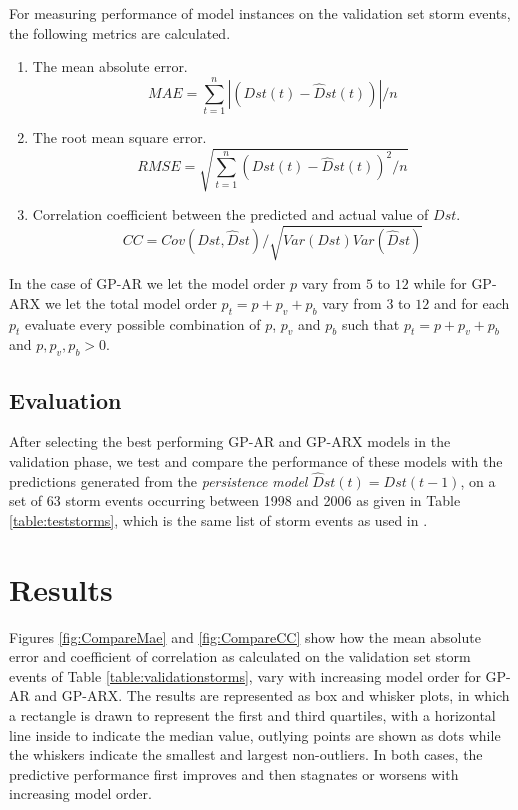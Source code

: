 For measuring performance of model instances on the validation set storm events, the following metrics are calculated.

\begin{enumerate}
    \item The mean absolute error.
    \begin{equation}
        MAE = \sum_{t=1}^{n} \left |(Dst(t) - \hat{D}st(t)) \right | / n
    \end{equation}
    \item The root mean square error.
    \begin{equation}
        RMSE = \sqrt{\sum_{t=1}^{n} (Dst(t) - \hat{D}st(t))^2 / n}
    \end{equation}
    \item Correlation coefficient between the predicted and actual value of $Dst$.
    \begin{equation}
        CC = Cov(Dst, \hat{D}st)/\sqrt{Var(Dst) Var(\hat{D}st)}
    \end{equation}
\end{enumerate}


In the case of GP-AR we let the model order $p$ vary from $5$ to $12$ while for GP-ARX we let the total model order $p_t = p + p_v + p_b$ vary from $3$ to $12$ and for each $p_t$ evaluate every possible combination of $p$, $p_v$ and $p_b$ such that $p_t = p + p_v + p_b$ and $p, p_{v}, p_b > 0$.

\subsection*{Evaluation}

After selecting the best performing GP-AR and GP-ARX models in the validation phase, we test and compare the performance of these models with the predictions generated from the \emph{persistence model} $\hat{D}st(t) = Dst(t-1)$, on a set of 63 storm events occurring between 1998 and 2006 as given in Table \ref{table:teststorms}, which is the same list of storm events as used in \cite{Ji2012}.


\section{Results}\label{sec:res}

Figures \ref{fig:CompareMae} and \ref{fig:CompareCC} show how the mean absolute error and coefficient of correlation as calculated on the validation set storm events of Table \ref{table:validationstorms}, vary with increasing model order for GP-AR and GP-ARX. The results are represented as box and whisker plots, in which a rectangle is drawn to represent the first and third quartiles, with a horizontal line inside to indicate the median value, outlying points are shown as dots while the whiskers indicate the smallest and largest non-outliers. In both cases, the predictive performance first improves and then stagnates or worsens with increasing model order. 

